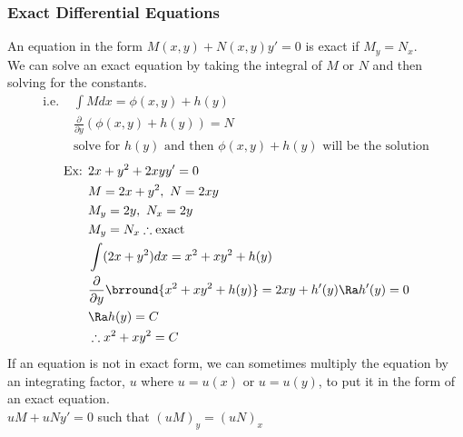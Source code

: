 \subsubsection{Exact Differential Equations}
An equation in the form $M(x,y)+N(x,y)y'=0$ is exact if $M_y=N_x$.\\
We can solve an exact equation by taking the integral of $M$ or $N$ and then solving for the constants.
\begin{align*}
    \text{i.e. }&\int M dx=\phi(x,y)+h(y)\\
    &\frac{\partial}{\partial y}(\phi(x,y)+h(y))=N\\
    &\text{solve for $h(y)$ and then $\phi(x,y)+h(y)$ will be the solution}
\end{align*}
\begin{align*}
    \text{Ex: }&2x+y^2+2xyy'=0\\
    &M=2x+y^2,\ N=2xy\\
    &M_y=2y,\ N_x=2y\\
    &M_y=N_x\therefore\text{exact}\\
    &\int(2x+y^2)dx=x^2+xy^2+h(y)\\
    &\frac{\partial}{\partial y}\brround{x^2+xy^2+h(y)}=2xy+h'(y)\Ra h'(y)=0\\
    &\Ra h(y)=C\\
    &\therefore x^2+xy^2=C
\end{align*}
If an equation is not in exact form, we can sometimes multiply the equation by an integrating factor, $u$ where $u=u(x)$ or $u=u(y)$, to put it in the form of an exact equation.\\
$uM+uNy'=0$ such that $(uM)_y=(uN)_x$
